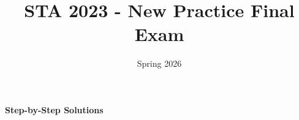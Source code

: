 \documentclass{article}
\title{STA 2023 - New Practice Final Exam}
\author{Spring 2026}
\date{}
\begin{document}
\maketitle








\newpage
\begin{center}
    \Huge \bfseries Step-by-Step Solutions
\end{center}
\vspace{2em}







\end{document}
